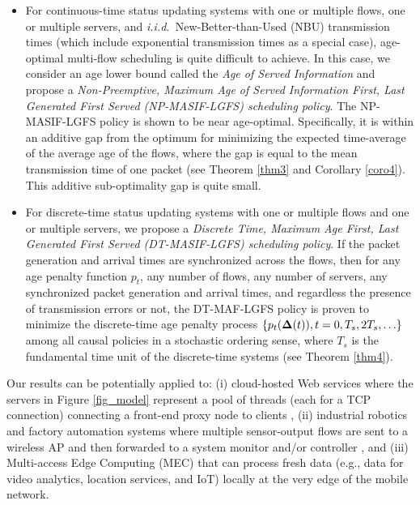\begin{itemize}
\item For continuous-time status updating systems with one or multiple flows, one or multiple servers, and \emph{i.i.d.}~New-Better-than-Used (NBU) transmission times (which include exponential transmission times as a special case),
 age-optimal multi-flow scheduling is quite difficult to achieve. In this case, 
we consider an age lower bound called the \emph{Age of Served Information} and propose a \emph{Non-Preemptive, Maximum Age of Served Information First, Last Generated First Served (NP-MASIF-LGFS) scheduling policy}. The NP-MASIF-LGFS policy is shown to be near age-optimal. Specifically, it is within an additive gap from the optimum for minimizing the expected time-average of the average age of the flows, where the gap is equal to the mean transmission time of one packet (see Theorem \ref{thm3} and Corollary \ref{coro4}). This additive sub-optimality gap is quite small. 

\item For discrete-time status updating systems with one or multiple flows and one or multiple servers, we propose a \emph{Discrete Time, Maximum Age First, Last Generated First Served (DT-MASIF-LGFS) scheduling policy}. If the packet generation and arrival times are synchronized across the flows, then for any age penalty function $p_t$, any number of flows, any number of servers, any synchronized packet generation and arrival times, and regardless the presence of transmission errors or not, the DT-MAF-LGFS policy is proven to minimize the discrete-time age penalty process $\{p_t (\bm{\Delta}(t)), t= 0, T_s, 2 T_s, \ldots\}$ among all causal policies in a stochastic ordering sense, where $T_s$ is the fundamental time unit of the discrete-time systems (see Theorem \ref{thm4}). %


\end{itemize}

\ifreport
Our results can be potentially applied to: (i) cloud-hosted Web services where the servers in Figure \ref{fig_model} represent a pool of threads (each for a TCP connection) connecting a front-end proxy node to clients \cite{Fox:1997:CSN:269005.266662}, (ii) industrial robotics and factory automation systems where multiple sensor-output flows are sent to a wireless AP and then forwarded to a system monitor and/or controller \cite{Gungor2009}, and (iii) Multi-access Edge Computing (MEC) that can process fresh data (e.g., data for video analytics, location services, and IoT) locally at the very edge of the mobile network. %
\fi

